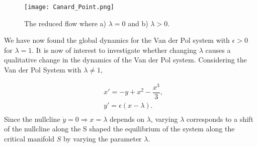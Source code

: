 \begin{figure}[h!]
	\centering
	\texttt{[image: Canard\_Point.png]}
	\caption{The reduced flow where a) $\lambda=0$ and b) $\lambda>0$.}
	\label{fig: Canard Point}
\end{figure}\newpage

We have now found the global dynamics for the Van der Pol system with $\epsilon >0$ for $\lambda =1$. It is now of interest to investigate whether changing $\lambda$ causes a qualitative change in the dynamics of the Van der Pol system.
Considering the Van der Pol System with $\lambda \neq 1$,

\begin{equation}
\begin{aligned}
&x'=-y+x^2-\dfrac{x^3}{3},\\
&y'=\epsilon(x-\lambda).\\
\end{aligned}
\label{eq: canard system}
\end{equation}
Since the nullcline $\dot{y}=0 \Rightarrow x=\lambda$ depends on $\lambda$, varying $\lambda$ corresponds to a shift of the nullcline along the S shaped  the equilibrium of the system along the critical manifold $S$ by varying the parameter $\lambda$.

